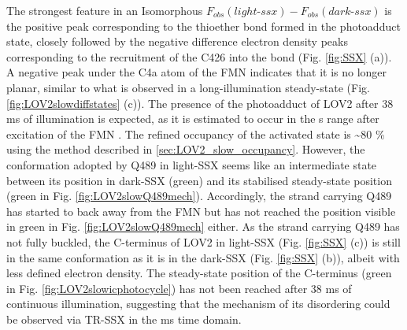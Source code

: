 The strongest feature in an Isomorphous \(F_{obs}(light\mbox{-}ssx) - F_{obs}(dark\mbox{-}ssx)\) is the positive peak corresponding to the thioether bond formed in the photoadduct state, closely followed by the negative difference electron density peaks corresponding to the recruitment of the C426 into the bond (Fig. \ref{fig:SSX} (a)). A negative peak under the C4a atom of the FMN indicates that it is no longer planar, similar to what is observed in a long-illumination steady-state (Fig. \ref{fig:LOV2slowdiffstates} (c)). The presence of the photoadduct of LOV2 after 38 ms of illumination is expected, as it is estimated to occur in the \textmu s range after excitation of the FMN \parencite{pfeiferTimeResolvedFourierTransform2009}. The refined occupancy of the activated state is \textasciitilde 80 \% using the method described in \ref{sec:LOV2_slow_occupancy}. However, the conformation adopted by Q489 in light-SSX seems like an intermediate state between its position in dark-SSX (green) and its stabilised steady-state position (green in Fig. \ref{fig:LOV2slowQ489mech}). Accordingly, the strand carrying Q489 has started to back away from the FMN but has not reached the position visible in green in Fig. \ref{fig:LOV2slowQ489mech} either. As the strand carrying Q489 has not fully buckled, the C-terminus of LOV2 in light-SSX (Fig. \ref{fig:SSX} (c)) is still in the same conformation as it is in the dark-SSX (Fig. \ref{fig:SSX} (b)), albeit with less defined electron density. The steady-state position of the C-terminus (green in Fig. \ref{fig:LOV2slowicphotocycle}) has not been reached after 38 ms of continuous illumination, suggesting that the mechanism of its disordering could be observed via TR-SSX in the ms time domain. 
